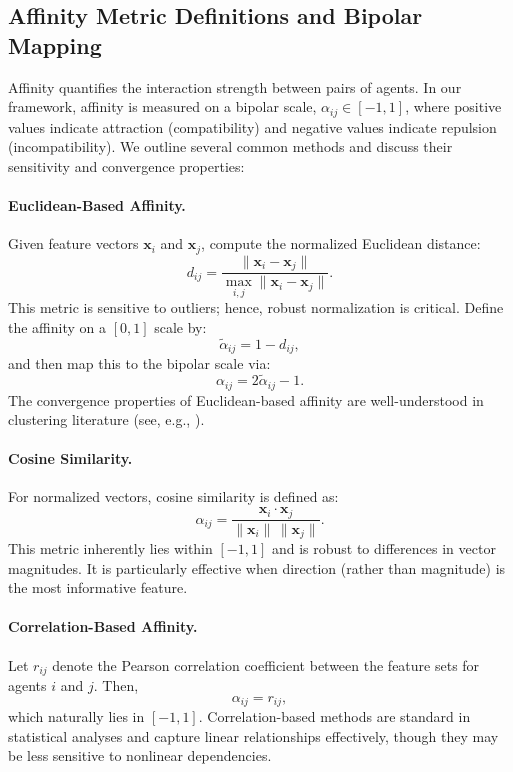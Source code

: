 \documentclass{article}
\begin{document}
\subsection{Affinity Metric Definitions and Bipolar Mapping}
Affinity quantifies the interaction strength between pairs of agents. In our framework, affinity is measured on a bipolar scale, $\alpha_{ij} \in [-1,1]$, where positive values indicate attraction (compatibility) and negative values indicate repulsion (incompatibility). We outline several common methods and discuss their sensitivity and convergence properties:

\paragraph{Euclidean-Based Affinity.}
Given feature vectors $\mathbf{x}_i$ and $\mathbf{x}_j$, compute the normalized Euclidean distance:
\[
d_{ij} = \frac{\|\mathbf{x}_i - \mathbf{x}_j\|}{\max_{i,j}\|\mathbf{x}_i - \mathbf{x}_j\|}.
\]
This metric is sensitive to outliers; hence, robust normalization is critical. Define the affinity on a $[0,1]$ scale by:
\[
\tilde{\alpha}_{ij} = 1 - d_{ij},
\]
and then map this to the bipolar scale via:
\[
\alpha_{ij} = 2\tilde{\alpha}_{ij} - 1.
\]
The convergence properties of Euclidean-based affinity are well-understood in clustering literature (see, e.g., \cite{jain1999data}).

\paragraph{Cosine Similarity.}
For normalized vectors, cosine similarity is defined as:
\[
\alpha_{ij} = \frac{\mathbf{x}_i \cdot \mathbf{x}_j}{\|\mathbf{x}_i\|\,\|\mathbf{x}_j\|}.
\]
This metric inherently lies within $[-1,1]$ and is robust to differences in vector magnitudes. It is particularly effective when direction (rather than magnitude) is the most informative feature.

\paragraph{Correlation-Based Affinity.}
Let $r_{ij}$ denote the Pearson correlation coefficient between the feature sets for agents $i$ and $j$. Then,
\[
\alpha_{ij} = r_{ij},
\]
which naturally lies in $[-1,1]$. Correlation-based methods are standard in statistical analyses and capture linear relationships effectively, though they may be less sensitive to nonlinear dependencies.
\end{document}
